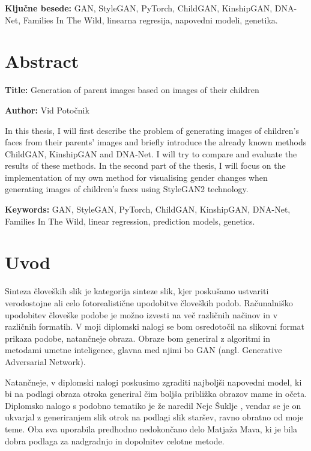 \documentclass[a4paper,12pt,openright]{book}
\newcommand{\ttitleEn}{Generation of parent images based on images of their children}
\newcommand{\tauthor}{Vid Potočnik}
\newcommand{\tkeywords}{GAN, StyleGAN, PyTorch, ChildGAN, KinshipGAN, DNA-Net, Families In The Wild, linearna regresija, napovedni modeli, genetika}
\newcommand{\tkeywordsEn}{GAN, StyleGAN, PyTorch, ChildGAN, KinshipGAN, DNA-Net, Families In The Wild, linear regression, prediction models, genetics}
\newcommand{\clearemptydoublepage}{\newpage{\pagestyle{empty}\cleardoublepage}}
\begin{document}
\bigskip

\noindent\textbf{Ključne besede:} \tkeywords.
\clearemptydoublepage

\chapter*{Abstract}

\noindent\textbf{Title:} \ttitleEn
\bigskip

\noindent\textbf{Author:} \tauthor
\bigskip

\noindent In this thesis, I will first describe the problem of generating images of children's faces from their parents' images and briefly introduce the already known methods ChildGAN, KinshipGAN and DNA-Net. I will try to compare and evaluate the results of these methods. In the second part of the thesis, I will focus on the implementation of my own method for visualising gender changes when generating images of children's faces using StyleGAN2 technology.\bigskip

\noindent\textbf{Keywords:} \tkeywordsEn.
\clearemptydoublepage

\mainmatter
\setcounter{page}{1}
\pagestyle{fancy}



\chapter{Uvod}


Sinteza človeških slik je kategorija sinteze slik, kjer poskušamo ustvariti verodostojne ali celo fotorealistične upodobitve človeških podob. Računalniško upodobitev človeške podobe je možno izvesti na več različnih načinov in v različnih formatih. V moji diplomski nalogi se bom osredotočil na slikovni format prikaza podobe, natančneje obraza. Obraze bom generiral z algoritmi in metodami umetne inteligence, glavna med njimi bo GAN (angl. Generative Adversarial Network).

Natančneje, v diplomski nalogi poskusimo zgraditi najboljši napovedni model, ki bi na podlagi obraza otroka generiral čim boljša približka obrazov mame in očeta. Diplomsko nalogo s podobno tematiko je že naredil Nejc Šuklje \cite{ŠUKLJE_2022}, vendar se je on ukvarjal z generiranjem slik otrok na podlagi slik staršev, ravno obratno od moje teme. Oba sva uporabila predhodno nedokončano delo Matjaža Mava, ki je bila dobra podlaga za nadgradnjo in dopolnitev celotne metode. 
\end{document}
